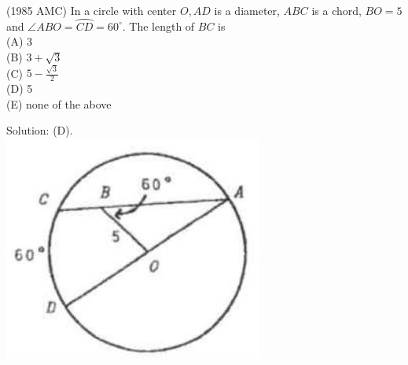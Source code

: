 \documentclass{article}
\begin{document}
(1985 AMC) In a circle with center \(O, A D\) is a diameter, \(A B C\) is a chord, \(B O=5\) and \(\angle A B O=\wideparen{C D}=60^{\circ}\). The length of \(B C\) is\\
(A) 3\\
(B) \(3+\sqrt{3}\)\\
(C) \(5-\frac{\sqrt{3}}{2}\)\\
(D) 5\\
(E) none of the above

Solution: (D).\\
\centering
\includegraphics[width=\textwidth]{images/166(1).jpg}
\end{document}
